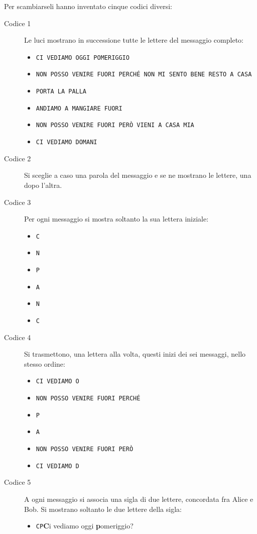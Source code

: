 Per scambiarseli hanno inventato cinque codici diversi:

\begin{description}
\item[Codice 1] Le luci mostrano in successione tutte le lettere del messaggio completo:
\begin{itemize}
\raggedright
\item \texttt{CI VEDIAMO OGGI POMERIGGIO}
\item \texttt{NON POSSO VENIRE FUORI PERCHÉ NON MI SENTO BENE RESTO A CASA}
\item \texttt{PORTA LA PALLA}
\item \texttt{ANDIAMO A MANGIARE FUORI}
\item \texttt{NON POSSO VENIRE FUORI PERÒ VIENI A CASA MIA}
\item \texttt{CI VEDIAMO DOMANI}
\end{itemize}
\item[Codice 2] Si sceglie a caso una parola del messaggio e se ne mostrano le lettere, una dopo l'altra.
\item[Codice 3] Per ogni messaggio si mostra soltanto la sua lettera iniziale:
\begin{itemize}
\item \texttt{C}
\item \texttt{N}
\item \texttt{P}
\item \texttt{A}
\item \texttt{N}
\item \texttt{C}
\end{itemize}
\item[Codice 4] Si trasmettono, una lettera alla volta, questi inizi dei sei messaggi, nello stesso ordine:
\begin{itemize}
\item \texttt{CI VEDIAMO O}
\item \texttt{NON POSSO VENIRE FUORI PERCHÉ}
\item \texttt{P}
\item \texttt{A}
\item \texttt{NON POSSO VENIRE FUORI PERÒ}
\item \texttt{CI VEDIAMO D}
\end{itemize}
\item[Codice 5] A ogni messaggio si associa una sigla di due lettere, concordata fra Alice e Bob. Si mostrano soltanto le due lettere della sigla:
\begin{itemize}
\item \texttt{CP}\quad \textcolor{ocre}{\textbf{C}}i vediamo oggi \textcolor{ocre}{\textbf{p}}omeriggio?

\end{itemize}
\end{description}

